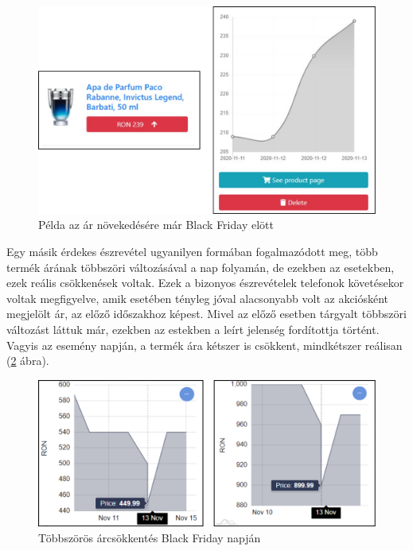 \begin{figure}[H]
    \centering
    \includegraphics[scale=0.9]{figures/images/study/parfum.png}
    \caption{Példa az ár növekedésére már Black Friday elött}
    \label{fig:parfum}
\end{figure}

Egy másik érdekes észrevétel ugyanilyen formában fogalmazódott meg, több termék árának többszöri változásával a nap folyamán, de ezekben az esetekben, ezek reális csökkenések voltak. Ezek a bizonyos észrevételek telefonok követésekor voltak megfigyelve, amik esetében tényleg jóval alacsonyabb volt az akciósként megjelölt ár, az előző időszakhoz képest. Mivel az előző esetben tárgyalt többszöri változást láttuk már, ezekben az estekben a leírt jelenség fordítottja történt. Vagyis az esemény napján, a termék ára kétszer is csökkent, mindkétszer reálisan (\ref{fig:real_sale} ábra).

\begin{figure}[H]
    \centering
    \includegraphics[scale=1]{figures/images/study/real_sale.png}
    \caption{Többszörös árcsökkentés Black Friday napján}
    \label{fig:real_sale}
\end{figure}

